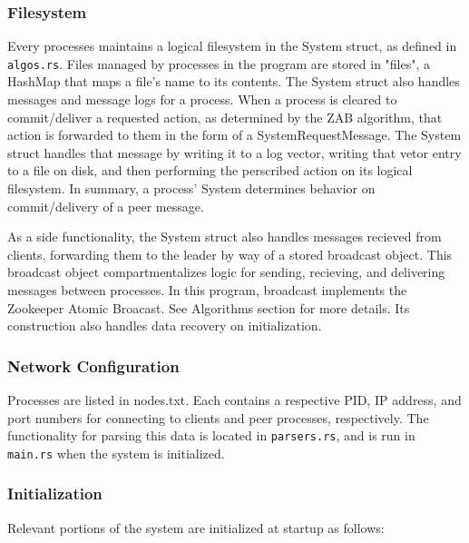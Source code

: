 \documentclass{article}
\begin{document}
    \subsubsection*{Filesystem}
        Every processes maintains a logical filesystem in the System struct, as defined in \verb|algos.rs|. Files managed by processes in the program are stored in "files", a HashMap that maps a file's name to its contents. The System struct also handles messages and message logs for a process. When a process is cleared to commit/deliver a requested action, as determined by the ZAB algorithm, that action is forwarded to them in the form of a SystemRequestMessage. The System struct handles that message by writing it to a log vector, writing that vetor entry to a file on disk, and then performing the perscribed action on its logical filesystem. In summary, a process' System determines behavior on commit/delivery of a peer message.

        As a side functionality, the System struct also handles messages recieved from clients, forwarding them to the leader by way of a stored broadcast object. This broadcast object compartmentalizes logic for sending, recieving, and delivering messages between processes. In this program, broadcast implements the Zookeeper Atomic Broacast. See Algorithms section for more details. Its construction also handles data recovery on initialization.

    \subsubsection*{Network Configuration}
        Processes are listed in nodes.txt. Each contains a respective PID, IP address, and port numbers for connecting to clients and peer processes, respectively. The functionality for parsing this data is located in \verb|parsers.rs|, and is run in \verb|main.rs| when the system is initialized.

    \subsubsection*{Initialization}
        Relevant portions of the system are initialized at startup as follows:
\end{document}
